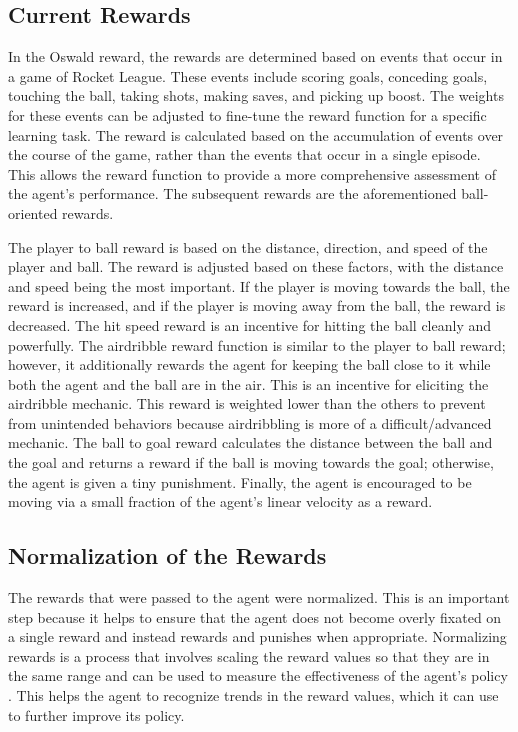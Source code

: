 \documentclass[10pt,twocolumn]{article}
\begin{document}
 \subsection{Current Rewards}
 In the Oswald reward, the rewards are determined based on events that occur in a game of Rocket League. These events include scoring goals, conceding goals, touching the ball, taking shots, making saves, and picking up boost. The weights for these events can be adjusted to fine-tune the reward function for a specific learning task. The reward is calculated based on the accumulation of events over the course of the game, rather than the events that occur in a single episode. This allows the reward function to provide a more comprehensive assessment of the agent's performance. The subsequent rewards are the aforementioned ball-oriented rewards.

 The player to ball reward is based on the distance, direction, and speed of the player and ball. The reward is adjusted based on these factors, with the distance and speed being the most important. If the player is moving towards the ball, the reward is increased, and if the player is moving away from the ball, the reward is decreased. The hit speed reward is an incentive for hitting the ball cleanly and powerfully. The airdribble reward function is similar to the player to ball reward; however, it additionally rewards the agent for keeping the ball close to it while both the agent and the ball are in the air. This is an incentive for eliciting the airdribble mechanic. This reward is weighted lower than the others to prevent from unintended behaviors because airdribbling is more of a difficult/advanced mechanic. The ball to goal reward calculates the distance between the ball and the goal and returns a reward if the ball is moving towards the goal; otherwise, the agent is given a tiny punishment. Finally, the agent is encouraged to be moving via a small fraction of the agent's linear velocity as a reward.

\subsection{Normalization of the Rewards}
 The rewards that were passed to the agent were normalized.  This is an important step because it helps to ensure that the agent does not become overly fixated on a single reward and instead rewards and punishes when appropriate. Normalizing rewards is a process that involves scaling the reward values so that they are in the same range and can be used to measure the effectiveness of the agent’s policy \cite{weng_2020}. This helps the agent to recognize trends in the reward values, which it can use to further improve its policy.
\end{document}
